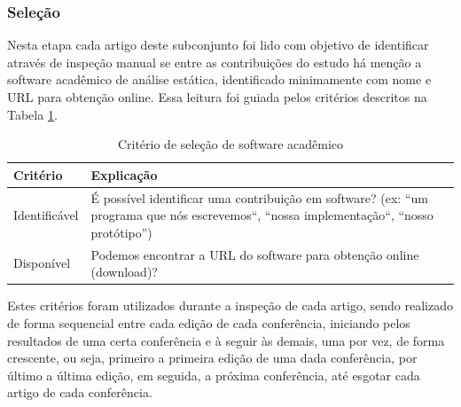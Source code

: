 \subsubsection{Seleção}

Nesta etapa cada artigo deste subconjunto foi lido com objetivo de identificar
através de inspeção manual se entre as contribuições do estudo há menção a
software acadêmico de análise estática, identificado minimamente com nome e URL
para obtenção online. 
Essa leitura foi guiada pelos critérios descritos na Tabela \ref{criterios-selecao}.


\begin{table}[h]
\caption{Critério de seleção de software acadêmico}
\centering
\begin{tabular}{ l p{12cm} }
  \hline
  Critério         & Explicação \\
  \hline
  Identificável    & É possível identificar uma contribuição em software? (ex: ``um programa que nós escrevemos``, ``nossa implementação``, ``nosso protótipo'') \\
  Disponível       & Podemos encontrar a URL do software para obtenção online (download)? \\
  \hline
\end{tabular}
\label{criterios-selecao}
\end{table}

Estes critérios foram utilizados durante a inspeção de cada artigo, sendo
realizado de forma sequencial entre cada edição de cada conferência, iniciando
pelos resultados de uma certa conferência e à seguir às demais, uma por vez, de
forma crescente, ou seja, primeiro a primeira edição de uma dada conferência,
por último a última edição, em seguida, a próxima conferência, até esgotar cada
artigo de cada conferência.


